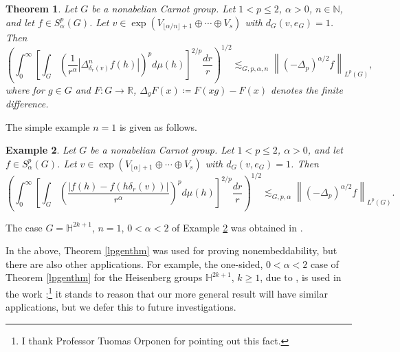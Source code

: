 \documentclass[11pt,reqno]{amsart}
\newtheorem{theorem}{Theorem}
\newtheorem{example}[theorem]{Example}
\newcommand{\1}{\mathbf 1}
\begin{document}
\begin{theorem}\label{VvsH}
Let $G$ be a nonabelian Carnot group. Let $1<p\le 2$, $\alpha>0$, $n\in \mathbb{N}$, and let $f\in S^p_\alpha\left(G\right)$. Let $v\in\exp\left( V_{\lfloor\alpha/n\rfloor+1}\oplus \cdots \oplus V_s\right)$ with $d_G\left(v,e_G\right)=1$.
Then
\begin{equation}\label{eq:VvsH}
\left(\int_0^\infty \left[ \int_G \left(\frac{1}{r^\alpha}\left|\Delta_{\delta_{r}\left(v\right)}^n f\left(h\right)\right| \right)^p d\mu\left(h\right) \right]^{2/p}  \frac{dr}{r} \right)^{1/2} \lesssim_{G,p,\alpha,n} \left\|\left(-\Delta_p\right)^{\alpha/2} f\right\|_{L^p\left(G\right)},
\end{equation}
where for $g\in G$ and $F:G\to\mathbb{R}$, $\Delta_gF\left(x\right)\coloneqq F\left(xg\right)-F\left(x\right)$ denotes the finite difference.
\end{theorem}

The simple example $n=1$ is given as follows.


\begin{example}\label{easyVvsH}
Let $G$ be a nonabelian Carnot group. Let $1<p\le 2$, $\alpha>0$, and let $f\in S^p_\alpha\left(G\right)$. Let $v\in \exp\left(V_{\lfloor\alpha\rfloor+1}\oplus \cdots \oplus V_s\right)$ with $d_G\left(v,e_G\right)=1$.
Then
\[
\left(\int_0^\infty \left[ \int_G \left(\frac{\left|f\left(h\right) - f\left(h\delta_r\left(v\right)\right)\right|}{r^\alpha} \right)^p d\mu\left(h\right) \right]^{2/p}  \frac{dr}{r} \right)^{1/2} \lesssim_{G,p,\alpha} \left\|\left(-\Delta_p\right)^{\alpha/2} f\right\|_{L^p\left(G\right)}.
\]
\end{example}

The case $G=\mathbb{H}^{2k+1}$, $n=1$, $0<\alpha<2$ of Example \ref{easyVvsH} was obtained in \cite{fassler2020vertical}.

In the above, Theorem \ref{lpgenthm} was used for proving nonembeddability, but there are also other applications. For example, the one-sided, $0<\alpha<2$ case of Theorem \ref{lpgenthm} for the Heisenberg groups $\mathbb{H}^{2k+1}$, $k\ge 1$, due to \cite{fassler2020dorronsoro}, is used in the work \cite{chousionis2022strong};\footnote{I thank Professor Tuomas Orponen for pointing out this fact.} it stands to reason that our more general result will have similar applications, but we defer this to future investigations.
\end{document}
